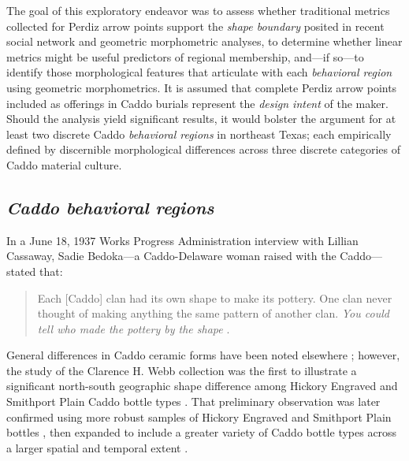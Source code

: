 \documentclass[smallextended]{svjour3}       %
\begin{document}
The goal of this exploratory endeavor was to assess whether traditional
metrics collected for Perdiz arrow points support the \emph{shape
boundary} posited in recent social network and geometric morphometric
analyses, to determine whether linear metrics might be useful predictors
of regional membership, and---if so---to identify those morphological
features that articulate with each \emph{behavioral region} using
geometric morphometrics. It is assumed that complete Perdiz arrow points
included as offerings in Caddo burials represent the \emph{design
intent} of the maker. Should the analysis yield significant results, it
would bolster the argument for at least two discrete Caddo
\emph{behavioral regions} in northeast Texas; each empirically defined
by discernible morphological differences across three discrete
categories of Caddo material culture.

\hypertarget{caddo-behavioral-regions}{%
\subsection{\texorpdfstring{\emph{Caddo behavioral
regions}}{Caddo behavioral regions}}\label{caddo-behavioral-regions}}

In a June 18, 1937 Works Progress Administration interview with Lillian
Cassaway, Sadie Bedoka---a Caddo-Delaware woman raised with the
Caddo---stated that:

\begin{quote}
Each {[}Caddo{]} clan had its own shape to make its pottery. One clan
never thought of making anything the same pattern of another clan.
\emph{You could tell who made the pottery by the shape}
\cite[395]{RN9357x}.
\end{quote}

General differences in Caddo ceramic forms have been noted elsewhere
\cite{RN5650,RN7162}; however, the study of the Clarence H. Webb
collection was the first to illustrate a significant north-south
geographic shape difference among Hickory Engraved and Smithport Plain
Caddo bottle types \cite{RN8370}. That preliminary observation was later
confirmed using more robust samples of Hickory Engraved and Smithport
Plain bottles \cite{RN8074,RN7927}, then expanded to include a greater
variety of Caddo bottle types across a larger spatial and temporal
extent \cite{RN8312}.
\end{document}
